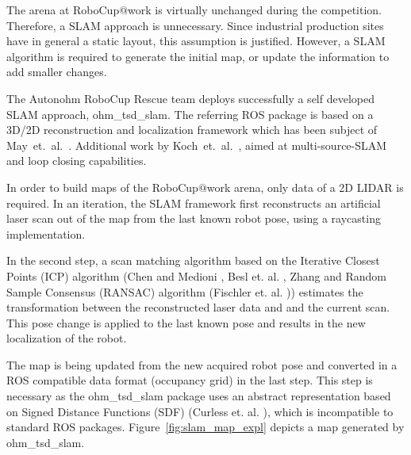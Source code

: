 
The arena at RoboCup$@$work is virtually unchanged during the competition. Therefore, a SLAM approach is unnecessary. Since industrial production sites have in general a static layout, this assumption is justified. However, a SLAM algorithm is required to generate the initial map, or update the information to add smaller changes.

The Autonohm RoboCup Rescue team deploys successfully a self developed SLAM approach, ohm\_tsd\_slam. The referring ROS package is based on a 3D/2D reconstruction and localization framework which has been subject of May~et.~al.~\cite{May2014}. Additional work by Koch~et.~al.~\cite{Koch2015}, aimed at multi-source-SLAM and loop closing capabilities. 

In order to build maps of the RoboCup$@$work arena, only data of a 2D LIDAR is required. In an iteration, the SLAM framework first reconstructs an artificial laser scan out of the map from the last known robot pose, using a raycasting implementation. 

In the second step, a scan matching algorithm based on the Iterative Closest Points (ICP) algorithm (Chen and Medioni \cite{chen:icp}, Besl et. al. \cite{bsl:icp}, Zhang \cite{zhang:icp} and Random Sample Consensus (RANSAC) algorithm (Fischler et. al. \cite{Fischler:ransac})) estimates the transformation between the reconstructed laser data and and the current scan. This pose change is applied to the last known pose and results in the new localization of the robot. 

The map is being updated from the new acquired robot pose and converted in a ROS compatible data format (occupancy grid) in the last step. This step is necessary as the ohm\_tsd\_slam package uses an abstract representation based on Signed Distance Functions (SDF) (Curless et. al. \cite{curless:sdf}), which is incompatible to standard ROS packages. Figure~\ref{fig:slam_map_expl} depicts a map generated by ohm\_tsd\_slam.

